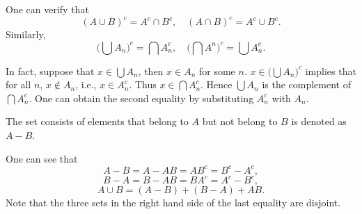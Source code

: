 \documentclass[11pt,singlecolumn, openany, citestyle=authoryear]{elegantbook}
\begin{document}
\begin{CJK}{UTF8}{gbsn}
    One can verify that 
    $$
    (A \cup B)^c = A^c \cap B^c, \quad (A \cap B)^c = A^c \cup B^c. 
    $$
    Similarly,
    $$
    \big(\bigcup A_n\big)^c =  \bigcap A_n^c, \quad \big(\bigcap A^n\big)^c = \bigcup A_n^c. 
    $$
    
    In fact, suppose that $x \in \bigcup A_n$, then $x \in A_n$ for some $n$. 
    $x \in \big(\bigcup A_n\big)^c$ implies that for all $n$, $x \notin A_n$, i.e., 
    $x\in A_n^c$. Thus $x \in \bigcap A_n^c$. Hence $\bigcup A_n$ is the complement of
    $\bigcap A_n^c$. One can obtain the second equality by substituting $A_n^c$ with $A_n$.
    
    \begin{figure}[h]
        \centering
    \end{figure}
    
    \begin{definition}
        The set consists of elements that belong to $A$ but not belong to $B$ is 
        denoted as $A-B$. 
    \end{definition}
    One can see that 
    \begin{equation}
        A-B = A-AB = AB^c = B^c-A^c,
    \end{equation}
    $$
    B-A = B-AB = BA^c = A^c-B^c,
    $$
    $$
    A\cup B = (A-B) + (B-A) + AB.
    $$
    Note that the three sets in the right hand side of the last equality are disjoint.
    

\end{CJK}
\end{document}

